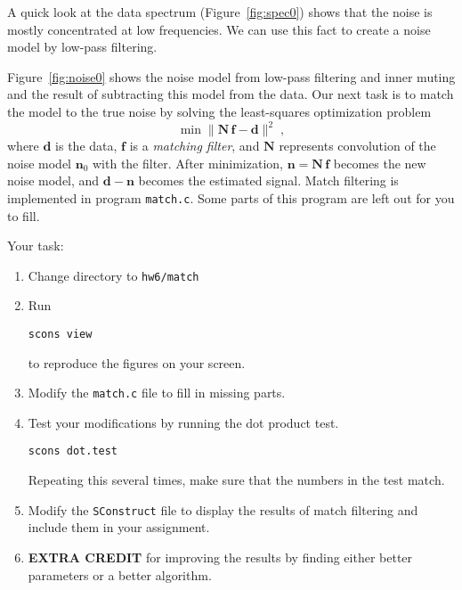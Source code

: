 A quick look at the data spectrum (Figure~\ref{fig:spec0}) shows that the
noise is mostly concentrated at low frequencies. We can use this fact
to create a noise model by low-pass filtering.


Figure~\ref{fig:noise0} shows the noise model from low-pass filtering
and inner muting and the result of subtracting this model from the
data. Our next task is to match the model to the true noise by solving
the least-squares optimization problem
\begin{equation}
\label{eq:ls}
\min \|\mathbf{N}\,\mathbf{f} - \mathbf{d}\|^2\;,
\end{equation}
where $\mathbf{d}$ is the data, $\mathbf{f}$ is a \emph{matching filter}, and
$\mathbf{N}$ represents convolution of the noise model
$\mathbf{n}_0$ with the filter. After minimization, $\mathbf{n} =
\mathbf{N}\,\mathbf{f}$ becomes the new noise model, and
$\mathbf{d}-\mathbf{n}$ becomes the estimated signal. Match filtering
is implemented in program \texttt{match.c}. Some parts of this program
are left out for you to fill.

\lstset{language=c,numbers=left,numberstyle=\tiny,showstringspaces=false}


Your task:
\begin{enumerate}
\item Change directory to \texttt{hw6/match}
\item Run 
\begin{verbatim}
scons view
\end{verbatim}
to reproduce the figures on your screen.
\item Modify the \texttt{match.c} file to fill in missing parts.
\item Test your modifications by running the dot product test.
\begin{verbatim}
scons dot.test
\end{verbatim}
Repeating this several times, make sure that the numbers in the test match.
\item  Modify the \texttt{SConstruct} file to display the results of match filtering
and include them in your assignment.
\item \textbf{EXTRA CREDIT} for improving the results by finding either better parameters or a better algorithm. 
\end{enumerate}

